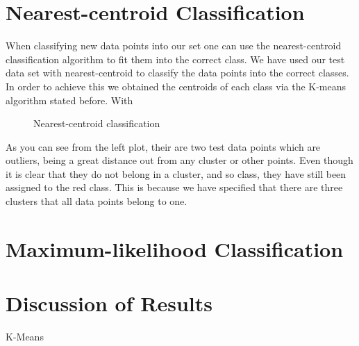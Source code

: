 \documentclass[a4paper, 11pt]{article}
\begin{document}
\section*{\vspace{-0.35cm}Nearest-centroid Classification}
When classifying new data points into our set one can use the nearest-centroid classification algorithm to fit them into the correct class. We have used our test data set with nearest-centroid to classify the data points into the correct classes. In order to achieve this we obtained the centroids of each class via the K-means algorithm stated before. With

\captionsetup[subfigure]{labelformat=empty}
\begin{figure}[h!]
    \centering
    \qquad
    \caption{Nearest-centroid classification}%
\end{figure}

As you can see from the left plot, their are two test data points which are outliers, being a great distance out from any cluster or other points. Even though it is clear that they do not belong in a cluster, and so class, they have still been assigned to the red class. This is because we have specified that there are three clusters that all data points belong to one.


\section*{\vspace{-0.35cm}Maximum-likelihood Classification}

\section*{\vspace{-0.35cm}Discussion of Results}

\begin{thebibliography}{9}
      K-Means
      \\\texttt{}
\end{thebibliography}
\end{document}
